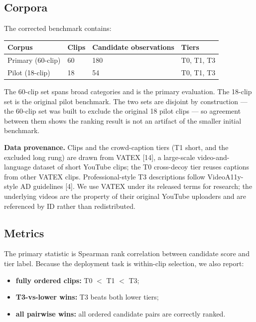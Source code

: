 \documentclass[10pt,twocolumn]{article}
\begin{document}
\subsection{Corpora}

The corrected benchmark contains:


\begin{table}[t]
\centering
\small
\begin{tabular}{@{}llll@{}}
\toprule
Corpus & Clips & Candidate observations & Tiers \\
\midrule
Primary (60-clip) & 60 & 180 & T0, T1, T3 \\
Pilot (18-clip) & 18 & 54 & T0, T1, T3 \\
\bottomrule
\end{tabular}
\end{table}

The 60-clip set spans broad categories and is the primary evaluation. The 18-clip set is the original pilot benchmark. The two sets are disjoint by construction --- the 60-clip set was built to exclude the original 18 pilot clips --- so agreement between them shows the ranking result is not an artifact of the smaller initial benchmark.

\textbf{Data provenance.} Clips and the crowd-caption tiers (T1 short, and the excluded long rung) are drawn from VATEX [14], a large-scale video-and-language dataset of short YouTube clips; the T0 cross-decoy tier reuses captions from other VATEX clips. Professional-style T3 descriptions follow VideoA11y-style AD guidelines [4]. We use VATEX under its released terms for research; the underlying videos are the property of their original YouTube uploaders and are referenced by ID rather than redistributed.


\subsection{Metrics}

The primary statistic is Spearman rank correlation between candidate score and tier label. Because the deployment task is within-clip selection, we also report:


\begin{itemize}[leftmargin=*]
\item \textbf{fully ordered clips:} T0 $<$ T1 $<$ T3;
\item \textbf{T3-vs-lower wins:} T3 beats both lower tiers;
\item \textbf{all pairwise wins:} all ordered candidate pairs are correctly ranked.
\end{itemize}
\end{document}
